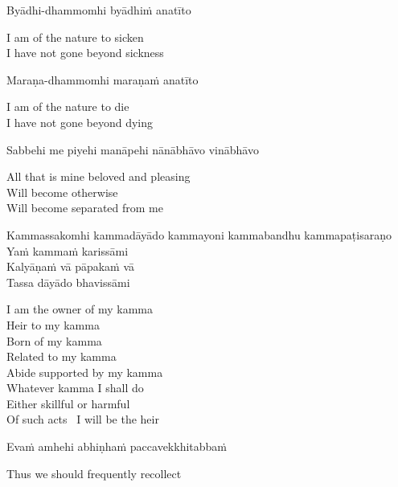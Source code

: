Byādhi-dhammomhi byādhiṁ anatīto

\begin{english}
  I am of the nature to sicken\\
  I have not gone beyond sickness
\end{english}

Maraṇa-dhammomhi maraṇaṁ anatīto

\begin{english}
  I am of the nature to die\\
  I have not gone beyond dying
\end{english}

Sabbehi me piyehi manāpehi nānābhāvo vinābhāvo

\begin{english}
  All that is mine beloved and pleasing\\
  Will become otherwise\\
  Will become separated from me
\end{english}

Kammassakomhi kammadāyādo kammayoni kammabandhu kammapaṭisaraṇo\\
Yaṁ kammaṁ karissāmi\\
Kalyāṇaṁ vā pāpakaṁ vā\\
Tassa dāyādo bhavissāmi

\begin{english}
  I am the owner of my kamma\\
  Heir to my kamma\\
  Born of my kamma\\
  Related to my kamma\\
  Abide supported by my kamma\\
  Whatever kamma I shall do\\
  Either skillful or harmful\\
  Of such acts \breathmark\ I will be the heir
\end{english}

Evaṁ amhehi abhiṇhaṁ paccavekkhitabbaṁ

\begin{english}
  Thus we should frequently recollect
\end{english}

\suttaRef{[AN 5.57]}


